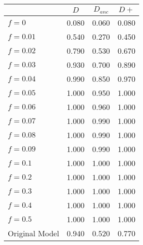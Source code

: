 \begin{tabular}{lccc}
\toprule
 & $D$ & $D_{anc}$ & $D+$ \\
\midrule
$f = 0$ & 0.080 & 0.060 & 0.080 \\
$f = 0.01$ & 0.540 & 0.270 & 0.450 \\
$f = 0.02$ & 0.790 & 0.530 & 0.670 \\
$f = 0.03$ & 0.930 & 0.700 & 0.890 \\
$f = 0.04$ & 0.990 & 0.850 & 0.970 \\
$f = 0.05$ & 1.000 & 0.950 & 1.000 \\
$f = 0.06$ & 1.000 & 0.960 & 1.000 \\
$f = 0.07$ & 1.000 & 0.990 & 1.000 \\
$f = 0.08$ & 1.000 & 0.990 & 1.000 \\
$f = 0.09$ & 1.000 & 0.990 & 1.000 \\
$f = 0.1$ & 1.000 & 1.000 & 1.000 \\
$f = 0.2$ & 1.000 & 1.000 & 1.000 \\
$f = 0.3$ & 1.000 & 1.000 & 1.000 \\
$f = 0.4$ & 1.000 & 1.000 & 1.000 \\
$f = 0.5$ & 1.000 & 1.000 & 1.000 \\
Original Model & 0.940 & 0.520 & 0.770 \\
\bottomrule
\end{tabular}
